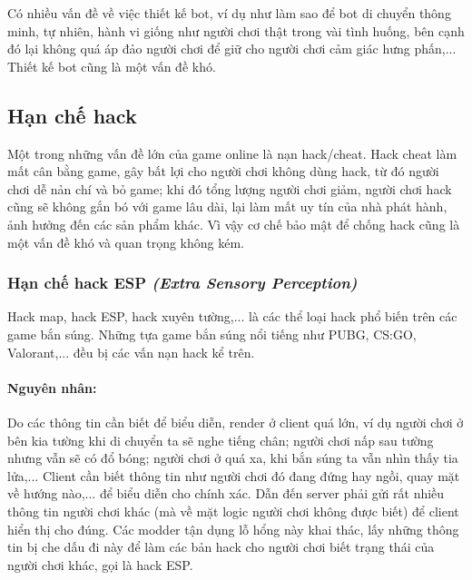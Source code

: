 \documentclass[12pt,a4paper]{article}
\begin{document}
  Có nhiều vấn đề về việc thiết kế bot, ví dụ như làm sao để bot di chuyển thông minh, tự nhiên, hành vi giống như người chơi thật trong vài tình huống, bên cạnh đó lại không quá áp đảo người chơi để giữ cho người chơi cảm giác hưng phấn,... Thiết kế bot cũng là một vấn đề khó.
  
  \subsection{Hạn chế hack}
  Một trong những vấn đề lớn của game online là nạn hack/cheat. Hack cheat làm mất cân bằng game, gây bất lợi cho người chơi không dùng hack, từ đó người chơi dễ nản chí và bỏ game; khi đó tổng lượng người chơi giảm, người chơi hack cũng sẽ không gắn bó với game lâu dài, lại làm mất uy tín của nhà phát hành, ảnh hưởng đến các sản phẩm khác. Vì vậy cơ chế bảo mật để chống hack cũng là một vấn đề khó và quan trọng không kém.
  
  \subsubsection{Hạn chế hack ESP \textit{(Extra Sensory Perception)}}
  
  Hack map, hack ESP, hack xuyên tường,... là các thể loại hack phổ biến trên các game bắn súng. Những tựa game bắn súng nổi tiếng như PUBG, CS:GO, Valorant,... đều bị các vấn nạn hack kể trên.
  \paragraph{Nguyên nhân:}\mbox{}
  
  Do các thông tin cần biết để biểu diễn, render ở client quá lớn, ví dụ người chơi ở bên kia tường khi di chuyển ta sẽ nghe tiếng chân; người chơi nấp sau tường nhưng vẫn sẽ có đổ bóng; người chơi ở quá xa, khi bắn súng ta vẫn nhìn thấy tia lửa,... Client cần biết thông tin như người chơi đó đang đứng hay ngồi, quay mặt về hướng nào,... để biểu diễn cho chính xác. Dẫn đến server phải gửi rất nhiều thông tin người chơi khác (mà về mặt logic người chơi không được biết) để client hiển thị cho đúng. Các modder tận dụng lỗ hổng này khai thác, lấy những thông tin bị che dấu đi này để làm các bản hack cho người chơi biết trạng thái của người chơi khác, gọi là hack ESP.
\end{document}
